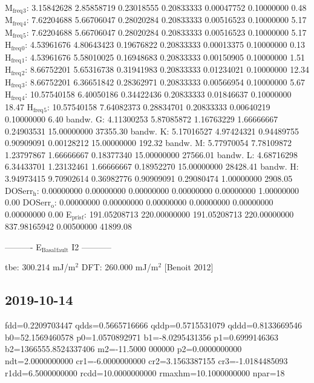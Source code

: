\documentclass[11pt]{article}
\begin{document}
M\(_{\text{freq}}\)\(_{\text{3}}\):   3.15842628   2.85858719   0.23018555   0.20833333   0.00047752   0.10000000         0.48
M\(_{\text{freq}}\)\(_{\text{4}}\):   7.62204688   5.66706047   0.28020284   0.20833333   0.00516523   0.10000000         5.17
M\(_{\text{freq}}\)\(_{\text{5}}\):   7.62204688   5.66706047   0.28020284   0.20833333   0.00516523   0.10000000         5.17
H\(_{\text{freq}}\)\(_{\text{0}}\):   4.53961676   4.80643423   0.19676822   0.20833333   0.00013375   0.10000000         0.13
H\(_{\text{freq}}\)\(_{\text{1}}\):   4.53961676   5.58010025   0.16948683   0.20833333   0.00150905   0.10000000         1.51
H\(_{\text{freq}}\)\(_{\text{2}}\):   8.66752201   5.65316738   0.31941983   0.20833333   0.01234021   0.10000000        12.34
H\(_{\text{freq}}\)\(_{\text{3}}\):   8.66752201   6.36651842   0.28362971   0.20833333   0.00566954   0.10000000         5.67
H\(_{\text{freq}}\)\(_{\text{4}}\):  10.57540158   6.40050186   0.34422436   0.20833333   0.01846637   0.10000000        18.47
H\(_{\text{freq}}\)\(_{\text{5}}\):  10.57540158   7.64082373   0.28834701   0.20833333   0.00640219   0.10000000         6.40
bandw. G:   4.11300253   5.87085872   1.16763229   1.66666667   0.24903531  15.00000000     37355.30
bandw. K:   5.17016527   4.97424321   0.94489755   0.90909091   0.00128212  15.00000000       192.32
bandw. M:   5.77970054   7.78109872   1.23797867   1.66666667   0.18377340  15.00000000     27566.01
bandw. L:   4.68716298   6.34433701   1.23132461   1.66666667   0.18952270  15.00000000     28428.41
bandw. H:   3.94973415   9.70902614   0.36982776   0.90909091   0.29080474   1.00000000      2908.05
DOSerr\(_{\text{h}}\):   0.00000000   0.00000000   0.00000000   0.00000000   0.00000000   1.00000000         0.00
DOSerr\(_{\text{o}}\):   0.00000000   0.00000000   0.00000000   0.00000000   0.00000000   0.00000000         0.00
E\(_{\text{pris}}\)\(_{\text{f}}\): 191.05208713 220.00000000 191.05208713 220.00000000 837.98165942   0.00500000     41899.08

----------     E\(_{\text{Basal}}\)\(_{\text{fault}}\) I2     -----------

tbe:       300.214 mJ/m\(^{\text{2}}\)
DFT:       260.000 mJ/m\(^{\text{2}}\) [Benoit  2012]



\subsection{2019-10-14}
\label{sec:org7fb8d99}

fdd=0.2209703447 qdds=0.5665716666 qddp=0.5715531079 qddd=0.8133669546 b0=52.1569460578 p0=1.0570892971 b1=-8.0295431356 p1=0.6999146363 b2=1366555.8524337406 m2=-11.5000
000000 p2=0.0000000000 ndt=2.0000000000 cr1=-6.0000000000 cr2=3.1563387155 cr3=-1.0184485093 r1dd=6.5000000000 rcdd=10.0000000000 rmaxhm=10.1000000000 npar=18 
\end{document}
